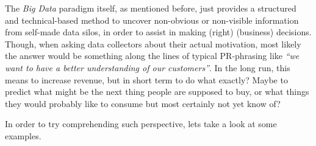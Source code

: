 \documentclass[12pt,english,a4paper,titlepage,cleardoublepage=empty,dottedtoc]{report}
\begin{document}
The \emph{Big Data} paradigm itself, as mentioned before, just provides
a structured and technical-based method to uncover non-obvious or
non-visible information from self-made data silos, in order to assist in
making (right) (business) decisions. Though, when asking data collectors
about their actual motivation, most likely the answer would be something
along the lines of typical PR-phrasing like \emph{``we want to have a
better understanding of our customers''}. In the long run, this means to
increase revenue, but in short term to do what exactly? Maybe to predict
what might be the next thing people are supposed to buy, or what things
they would probably like to consume but most certainly not yet know of?

In order to try comprehending such perspective, lets take a look at some
examples.
\end{document}
